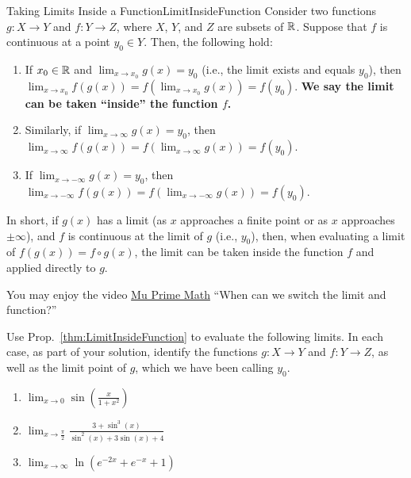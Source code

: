 \bigskip

\begin{propColor}{Taking Limits Inside a Function}{LimitInsideFunction}
    Consider two functions $g:X \to Y$ and $f:Y \to Z$, where $X$, $Y$, and $Z$ are subsets of $\mathbb R$. Suppose that $f$ is continuous at a point $y_0 \in Y$. Then, the following hold:
\begin{enumerate}
\renewcommand{\labelenumi}{(\alph{enumi})}
\setlength{\itemsep}{.2cm}

\item If $x_0 \in \mathbb R$ and $\displaystyle \lim_{x \to x_0} g(x) = y_0$ (i.e., the limit exists and equals $y_0$), then $\displaystyle \lim_{x \to x_0} f(g(x)) = f(\lim_{x \to x_0} g(x)) = f(y_0). $ \textbf{We say the limit can be taken ``inside'' the function $f$.}

\item Similarly, if $\displaystyle \lim_{x \to \infty} g(x) = y_0$, then $\displaystyle \lim_{x \to \infty} f(g(x)) = f(\lim_{x \to \infty} g(x)) = f(y_0). $  

\item If $\displaystyle \lim_{x \to -\infty} g(x) = y_0$, then $\displaystyle \lim_{x \to -\infty} f(g(x)) = f(\lim_{x \to -\infty} g(x)) = f(y_0). $ 
\end{enumerate}
In short, if $g(x)$ has a limit (as $x$ approaches a finite point or as $x$ approaches $\pm \infty$), and $f$ is continuous at the limit of $g$ (i.e., $y_0$), then, when evaluating a limit of $f(g(x)) = f\circ g(x)$,  the limit can be taken inside the function $f$ and applied directly to $g$.  
\end{propColor}

\bigskip
You may enjoy the video \href{https://youtu.be/H2RQC4PxEM0}{Mu Prime Math} ``When can we switch the limit and function?''
\bigskip

\begin{example}
\label{ex:LimitsUsingcontinuity}
Use Prop.~\ref{thm:LimitInsideFunction} to evaluate the following limits. In each case, as part of your solution, identify the functions $g:X \to Y$ and $f:Y \to Z$, as well as the limit point of $g$, which we have been calling $y_0$.
\begin{enumerate}
\renewcommand{\labelenumi}{(\alph{enumi})}
\setlength{\itemsep}{.2cm}

\item $ \displaystyle \lim_{x \to 0} \sin\left( \frac{x}{1 + x^2} \right)$

\item $ \displaystyle \lim_{x \to \frac{\pi}{2} } \frac{3 + \sin^3(x)}{\sin^2(x) + 3 \sin(x) + 4}$

\item $ \displaystyle \lim_{x \to \infty} \ln(e^{-2x} + e^{-x} + 1) $
\end{enumerate}    
\end{example}


